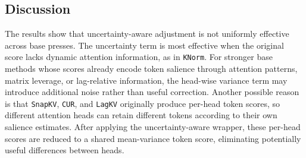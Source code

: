 \documentclass{article}
\begin{document}



\subsection{Discussion}
\label{subsec:discussion}

The results show that uncertainty-aware adjustment is not uniformly effective across base presses.
The uncertainty term is most effective when the original score lacks dynamic attention information, as in \texttt{KNorm}.
For stronger base methods whose scores already encode token salience through attention patterns, matrix leverage, or lag-relative information, the head-wise variance term may introduce additional noise rather than useful correction.
Another possible reason is that \texttt{SnapKV}, \texttt{CUR}, and \texttt{LagKV} originally produce per-head token scores, so different attention heads can retain different tokens according to their own salience estimates.
After applying the uncertainty-aware wrapper, these per-head scores are reduced to a shared mean-variance token score, eliminating potentially useful differences between heads.
\end{document}
